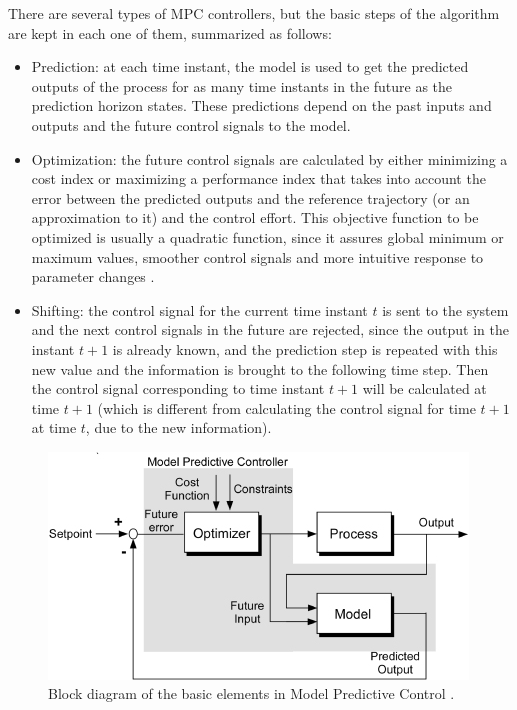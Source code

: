 There are several types of MPC controllers, but the basic steps of the algorithm are kept in each one of them, summarized as follows:

\begin{itemize}

\item Prediction: at each time instant, the model is used to get the predicted outputs of the process for as many time instants in the future as the prediction horizon states. These predictions depend on the past inputs and outputs and the future control signals to the model.

\item Optimization: the future control signals are calculated by either minimizing a cost index or maximizing a performance index that takes into account the error between the predicted outputs and the reference trajectory (or an approximation to it) and the control effort. This objective function to be optimized is usually a quadratic function, since it assures global minimum or maximum values, smoother control signals and more intuitive response to parameter changes \cite{Hovd2004}.

\item Shifting: the control signal for the current time instant $t$ is sent to the system and the next control signals in the future are rejected, since the output in the instant $t + 1$ is already known, and the prediction step is repeated with this new value and the information is brought to the following time step. Then the control signal corresponding to time instant    $t + 1$ will be calculated at time $t + 1$ (which is different from calculating the control signal for time $t + 1$ at time $t$, due to the new information).

\end{itemize}

\begin{figure}[h!]
\centering
\includegraphics[scale=0.8]{Images/Chapter2/mpc_block_diagram.jpg}
\caption{Block diagram of the basic elements in Model Predictive Control \cite{Al-Sanad2005}.}
\label{fig:mpc_diagram}
\end{figure}

